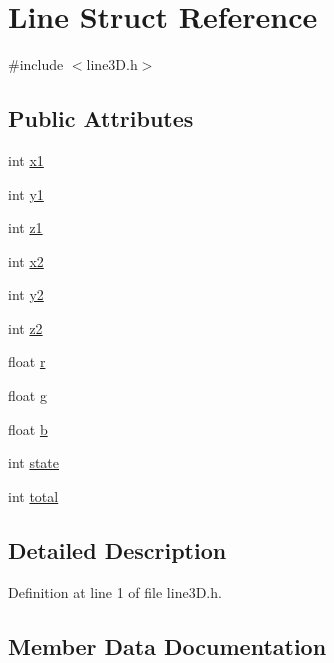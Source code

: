 \hypertarget{struct_line}{}\section{Line Struct Reference}
\label{struct_line}


{\ttfamily \#include $<$line3\+D.\+h$>$}

\subsection*{Public Attributes}
\begin{DoxyCompactItemize}
\item 
int \mbox{\hyperlink{struct_line_a1c37aeef714f6c96454c2a9a2dadb69a}{x1}}
\item 
int \mbox{\hyperlink{struct_line_a850c96af61bd595a68b5e867540204f1}{y1}}
\item 
int \mbox{\hyperlink{struct_line_a96c7c34bb26b387aed84206e8739a272}{z1}}
\item 
int \mbox{\hyperlink{struct_line_a4f08d1038eba337d6f0fb32713e528f1}{x2}}
\item 
int \mbox{\hyperlink{struct_line_ae31c92ab0df730a2fdd34201ce6feb9d}{y2}}
\item 
int \mbox{\hyperlink{struct_line_a1b6e306dc5d91f6f6046892b0b12350d}{z2}}
\item 
float \mbox{\hyperlink{struct_line_a3f97829ba40f49f7fb8408b66bdafa84}{r}}
\item 
float \mbox{\hyperlink{struct_line_a18c636b47c164dfbf0c665c60a4cde8f}{g}}
\item 
float \mbox{\hyperlink{struct_line_a7fccb394f787fbd80f70cbec0e867afc}{b}}
\item 
int \mbox{\hyperlink{struct_line_a7452de32bd854712f485a46dddff416b}{state}}
\item 
int \mbox{\hyperlink{struct_line_a65c23427f8935b60c4f76ae8a7df1f98}{total}}
\end{DoxyCompactItemize}


\subsection{Detailed Description}


Definition at line 1 of file line3\+D.\+h.



\subsection{Member Data Documentation}
\mbox{\label{struct_line_a7fccb394f787fbd80f70cbec0e867afc}} 
